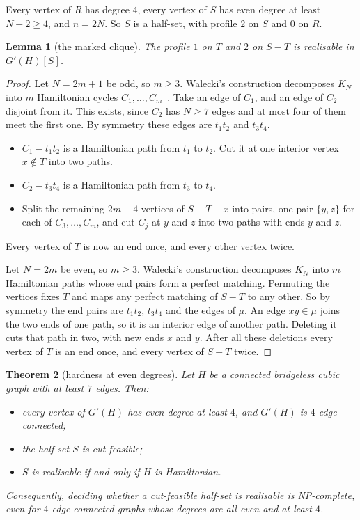 \documentclass[11pt]{amsart}
\newtheorem{theorem}{Theorem}
\newtheorem{lemma}[theorem]{Lemma}
\theoremstyle{definition}
\begin{document}
Every vertex of $R$ has degree $4$, every vertex of $S$ has even degree at least $N-2\ge4$, and
$n=2N$. So $S$ is a half-set, with profile $2$ on $S$ and $0$ on $R$.

\begin{lemma}[the marked clique]\label{lem:clique}
The profile $1$ on $T$ and $2$ on $S-T$ is realisable in $G'(H)[S]$.
\end{lemma}

\begin{proof}
Let $N=2m+1$ be odd, so $m\ge3$. Walecki's construction decomposes $K_N$ into $m$ Hamiltonian
cycles $C_1,\dots,C_m$~\cite{Als08}. Take an edge of $C_1$, and an edge of $C_2$ disjoint from it. This
exists, since $C_2$ has $N\ge7$ edges and at most four of them meet the first one. By symmetry these
edges are $t_1t_2$ and $t_3t_4$.
\begin{itemize}
\item $C_1-t_1t_2$ is a Hamiltonian path from $t_1$ to $t_2$. Cut it at one interior vertex $x\notin T$
into two paths.
\item $C_2-t_3t_4$ is a Hamiltonian path from $t_3$ to $t_4$.
\item Split the remaining $2m-4$ vertices of $S-T-x$ into pairs, one pair $\{y,z\}$ for each of
$C_3,\dots,C_m$, and cut $C_j$ at $y$ and $z$ into two paths with ends $y$ and $z$.
\end{itemize}
Every vertex of $T$ is now an end once, and every other vertex twice.

Let $N=2m$ be even, so $m\ge3$. Walecki's construction decomposes $K_N$ into $m$ Hamiltonian paths
whose end pairs form a perfect matching. Permuting the vertices fixes $T$ and maps any perfect
matching of $S-T$ to any other. So by symmetry the end pairs are $t_1t_2$, $t_3t_4$ and the edges of
$\mu$. An edge $xy\in\mu$ joins the two ends of one path, so it is an interior edge of another path.
Deleting it cuts that path in two, with new ends $x$ and $y$. After all these deletions every vertex
of $T$ is an end once, and every vertex of $S-T$ twice.
\end{proof}

\begin{theorem}[hardness at even degrees]\label{thm:hard4}
Let $H$ be a connected bridgeless cubic graph with at least $7$ edges. Then:
\begin{itemize}
\item every vertex of $G'(H)$ has even degree at least $4$, and $G'(H)$ is $4$-edge-connected;
\item the half-set $S$ is cut-feasible;
\item $S$ is realisable if and only if $H$ is Hamiltonian.
\end{itemize}
Consequently, deciding whether a cut-feasible half-set is realisable is NP-complete, even for
$4$-edge-connected graphs whose degrees are all even and at least $4$.
\end{theorem}
\end{document}

